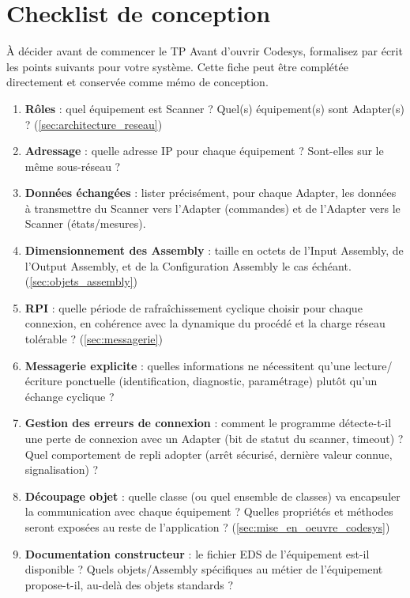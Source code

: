 \section{Checklist de conception}
\label{sec:checklist_conception}

\begin{UPSTIidee}{À décider avant de commencer le TP}
    Avant d'ouvrir Codesys, formalisez par écrit les points suivants pour votre système. Cette fiche peut être complétée directement et conservée comme mémo de conception.
\end{UPSTIidee}

\begin{enumerate}
    \item \textbf{Rôles} : quel équipement est Scanner ? Quel(s) équipement(s) sont Adapter(s) ? (\ref{sec:architecture_reseau})
    \item \textbf{Adressage} : quelle adresse IP pour chaque équipement ? Sont-elles sur le même sous-réseau ?
    \item \textbf{Données échangées} : lister précisément, pour chaque Adapter, les données à transmettre du Scanner vers l'Adapter (commandes) et de l'Adapter vers le Scanner (états/mesures).
    \item \textbf{Dimensionnement des Assembly} : taille en octets de l'Input Assembly, de l'Output Assembly, et de la Configuration Assembly le cas échéant. (\ref{sec:objets_assembly})
    \item \textbf{RPI} : quelle période de rafraîchissement cyclique choisir pour chaque connexion, en cohérence avec la dynamique du procédé et la charge réseau tolérable ? (\ref{sec:messagerie})
    \item \textbf{Messagerie explicite} : quelles informations ne nécessitent qu'une lecture/écriture ponctuelle (identification, diagnostic, paramétrage) plutôt qu'un échange cyclique ?
    \item \textbf{Gestion des erreurs de connexion} : comment le programme détecte-t-il une perte de connexion avec un Adapter (bit de statut du scanner, timeout) ? Quel comportement de repli adopter (arrêt sécurisé, dernière valeur connue, signalisation) ?
    \item \textbf{Découpage objet} : quelle classe (ou quel ensemble de classes) va encapsuler la communication avec chaque équipement ? Quelles propriétés et méthodes seront exposées au reste de l'application ? (\ref{sec:mise_en_oeuvre_codesys})
    \item \textbf{Documentation constructeur} : le fichier EDS de l'équipement est-il disponible ? Quels objets/Assembly spécifiques au métier de l'équipement propose-t-il, au-delà des objets standards ?
\end{enumerate}

